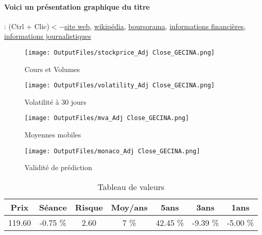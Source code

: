 \documentclass[11pt,a4paper]{report}%
\begin{document}
\paragraph{Voici un présentation graphique du titre} : (Ctrl + Clic)$<-$\href{https://www.gecina.fr/fr/investisseurs}{site web}, \href{https://fr.wikipedia.org/wiki/Gecina}{wikipédia}, \href{https://www.boursorama.com/cours/1rPGFC}{boursorama}, \href{https://www.qwant.com/?q=site:https:%2f%2fwww.easybourse.com%2faction-societe%2fGECINA&t=web&client=ext-firefox-hp}{informations financières}, \href{https://bourse.lerevenu.com/cours-de-bourse/fiche-valeur-synthese/GECINA/GFC-FR}{informations journalistiques}
\begin{figure}[!htb]
   \begin{minipage}{0.5\textwidth}
     \centering
     \texttt{[image: OutputFiles/stockprice\_Adj Close\_GECINA.png]}
     \caption{Cours et Volumes}\label{Fig:price_GECINA}
   \end{minipage}\hfill
   \begin{minipage}{0.5\textwidth}
     \centering
     \texttt{[image: OutputFiles/volatility\_Adj Close\_GECINA.png]}
     \caption{Volatilité à 30 jours}\label{Fig:volat_GECINA}
   \end{minipage}
\end{figure}
\begin{figure}[!htb]
   \begin{minipage}{0.5\textwidth}
     \centering
     \texttt{[image: OutputFiles/mva\_Adj Close\_GECINA.png]}
     \caption{Moyennes mobiles}\label{Fig:mva_GECINA}
   \end{minipage}\hfill
   \begin{minipage}{0.5\textwidth}
     \centering
     \texttt{[image: OutputFiles/monaco\_Adj Close\_GECINA.png]}
     \caption{Validité de prédiction}\label{Fig:prediction_GECINA}
   \end{minipage}
\end{figure}

\begin{table}[H]
  \centering
    \begin{tabular}{|c|c|c|c|c|c|c|}
    \hline
    Prix & Séance & Risque  & Moy/ans & 5ans & 3ans & 1ans \\
    \hline
    119.60 &    -0.75 \%    & 2.60 & 7 \% & 42.45 \% & -9.39 \% & -5.00 \% \\
    \hline
    \end{tabular}%
        \label{tab:table_GECINA}%
      \caption{Tableau de valeurs}
\end{table}%
\end{document}
